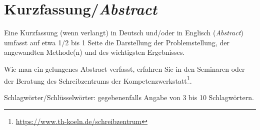 \chapter*{Kurzfassung/\emph{Abstract}}
\label{chap:abstract}
%
Eine Kurzfassung (wenn verlangt) in Deutsch und/oder in Englisch (\emph{Abstract}) umfasst auf etwa 1/2 bis 1 Seite die Darstellung der Problemstellung, der angewandten Methode(n) und des wichtigsten Ergebnisses.
\par
Wie man ein gelungenes Abstract verfasst, erfahren Sie in den Seminaren oder der Beratung des Schreibzentrums der Kompetenzwerkstatt\footnote{\href{https://www.th-koeln.de/schreibzentrum}{https://www.th-koeln.de/schreibzentrum}}.
\par
Schlagwörter/Schlüsselwörter: gegebenenfalls Angabe von 3 bis 10 Schlagwörtern.